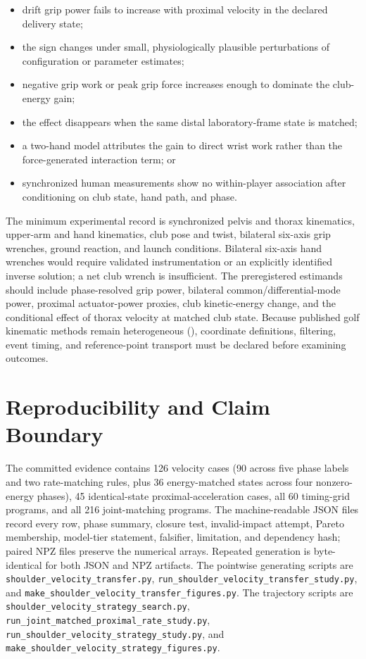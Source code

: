 \documentclass[
  letterpaper,
]{report}
\providecommand{\tightlist}{%
  \setlength{\itemsep}{0pt}\setlength{\parskip}{0pt}}
\begin{document}
\begin{itemize}
\tightlist
\item
  drift grip power fails to increase with proximal velocity in the
  declared delivery state;
\item
  the sign changes under small, physiologically plausible perturbations
  of configuration or parameter estimates;
\item
  negative grip work or peak grip force increases enough to dominate the
  club-energy gain;
\item
  the effect disappears when the same distal laboratory-frame state is
  matched;
\item
  a two-hand model attributes the gain to direct wrist work rather than
  the force-generated interaction term; or
\item
  synchronized human measurements show no within-player association
  after conditioning on club state, hand path, and phase.
\end{itemize}

The minimum experimental record is synchronized pelvis and thorax
kinematics, upper-arm and hand kinematics, club pose and twist,
bilateral six-axis grip wrenches, ground reaction, and launch
conditions. Bilateral six-axis hand wrenches would require validated
instrumentation or an explicitly identified inverse solution; a net club
wrench is insufficient. The preregistered estimands should include
phase-resolved grip power, bilateral common/differential-mode power,
proximal actuator-power proxies, club kinetic-energy change, and the
conditional effect of thorax velocity at matched club state. Because
published golf kinematic methods remain heterogeneous
(), coordinate
definitions, filtering, event timing, and reference-point transport must
be declared before examining outcomes.

\section{Reproducibility and Claim
Boundary}\label{reproducibility-and-claim-boundary}

The committed evidence contains 126 velocity cases (90 across five phase
labels and two rate-matching rules, plus 36 energy-matched states across
four nonzero-energy phases), 45 identical-state proximal-acceleration
cases, all 60 timing-grid programs, and all 216 joint-matching programs.
The machine-readable JSON files record every row, phase summary, closure
test, invalid-impact attempt, Pareto membership, model-tier statement,
falsifier, limitation, and dependency hash; paired NPZ files preserve
the numerical arrays. Repeated generation is byte-identical for both
JSON and NPZ artifacts. The pointwise generating scripts are
\texttt{shoulder\_velocity\_transfer.py},
\texttt{run\_shoulder\_velocity\_transfer\_study.py}, and
\texttt{make\_shoulder\_velocity\_transfer\_figures.py}. The trajectory
scripts are \texttt{shoulder\_velocity\_strategy\_search.py},
\texttt{run\_joint\_matched\_proximal\_rate\_study.py},
\texttt{run\_shoulder\_velocity\_strategy\_study.py}, and
\texttt{make\_shoulder\_velocity\_strategy\_figures.py}.
\end{document}
